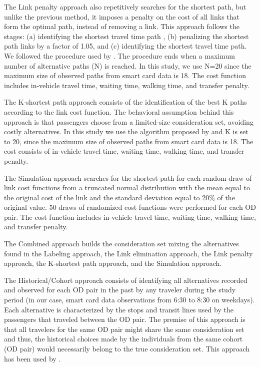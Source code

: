 \documentclass[12pt,a4paper]{article}
\begin{document}
The Link penalty approach also repetitively searches for the shortest path, but unlike the previous method, it imposes a penalty on the cost of all links that form the optimal path, instead of removing a link. This approach follows the stages: (a) identifying the shortest travel time path , (b) penalizing the shortest path links by a factor of 1.05, and (c) identifying the shortest travel time path. We followed the procedure used by \cite{prato2007modeling}. The procedure ends when a maximum number of alternative paths (N) is reached. In this study, we use N=20 since the maximum size of observed paths from smart card data is 18. The cost function includes in-vehicle travel time, waiting time, walking time, and transfer penalty. 

The K-shortest path approach consists of the identification of the best K paths according to the link cost function. The behavioral assumption behind this approach is that passengers choose from a limited-size consideration set, avoiding costly alternatives. In this study we use the algorithm proposed by \cite{yen1971finding} and K is set to 20, since the maximum size of observed paths from smart card data is 18. The cost consists of in-vehicle travel time, waiting time, walking time, and transfer penalty.   

The Simulation approach searches for the shortest path for each random draw of link cost functions from a truncated normal distribution with the mean equal to the original cost of the link and the standard deviation equal to 20\% of the original value. 50 draws of randomized cost functions were performed for each OD pair. The cost function includes in-vehicle travel time, waiting time, walking time, and transfer penalty.

The Combined approach builds the consideration set mixing the alternatives found in the Labeling approach, the Link elimination approach, the Link penalty approach, the K-shortest path approach, and the Simulation approach.

The Historical/Cohort approach consists of identifying all alternatives recorded and observed for each OD pair in the past by any traveler during the study period (in our case, smart card data observations from 6:30 to 8:30 on weekdays). Each alternative is characterized by the stops and transit lines used by the passengers that traveled between the OD pair. The premise of this approach is that all travelers for the same OD pair might share the same consideration set and thus, the historical choices made by the individuals from the same cohort (OD pair) would necessarily belong to the true consideration set. This approach has been used by \cite{yap2020crowding, kim2019calibration, janovsikova2014estimation}.
\end{document}
